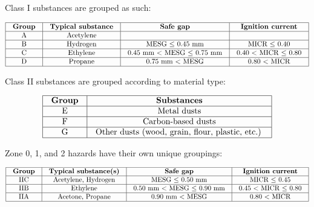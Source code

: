 \vskip 10pt

Class I substances are grouped as such:


$$\vbox{\offinterlineskip
\halign{\strut
\vrule \quad\hfil # \ \hfil & 
\vrule \quad\hfil # \ \hfil & 
\vrule \quad\hfil # \ \hfil & 
\vrule \quad\hfil # \ \hfil \vrule \cr
\noalign{\hrule}
%
{\bf Group} & {\bf Typical substance} & {\bf Safe gap} & {\bf Ignition current} \cr
%
\noalign{\hrule}
%
A & Acetylene &  &  \cr
%
\noalign{\hrule}
%
B & Hydrogen & MESG $\leq$ 0.45 mm & MICR $\leq$ 0.40 \cr
%
\noalign{\hrule}
%
C & Ethylene & 0.45 mm $<$ MESG $\leq$ 0.75 mm & 0.40 $<$ MICR $\leq$ 0.80 \cr
%
\noalign{\hrule}
%
D & Propane & 0.75 mm $<$ MESG & 0.80 $<$ MICR \cr
%
\noalign{\hrule}
} %
}$$ %

\vskip 10pt

Class II substances are grouped according to material type:


$$\vbox{\offinterlineskip
\halign{\strut
\vrule \quad\hfil # \ \hfil & 
\vrule \quad\hfil # \ \hfil \vrule \cr
\noalign{\hrule}
%
{\bf Group} & {\bf Substances} \cr
%
\noalign{\hrule}
%
E & Metal dusts \cr
%
\noalign{\hrule}
%
F & Carbon-based dusts \cr
%
\noalign{\hrule}
%
G & Other dusts (wood, grain, flour, plastic, etc.) \cr
%
\noalign{\hrule}
} %
}$$ %

\vskip 10pt

Zone 0, 1, and 2 hazards have their own unique groupings:


$$\vbox{\offinterlineskip
\halign{\strut
\vrule \quad\hfil # \ \hfil & 
\vrule \quad\hfil # \ \hfil & 
\vrule \quad\hfil # \ \hfil & 
\vrule \quad\hfil # \ \hfil \vrule \cr
\noalign{\hrule}
%
{\bf Group} & {\bf Typical substance(s)} & {\bf Safe gap} & {\bf Ignition current} \cr
%
\noalign{\hrule}
%
IIC & Acetylene, Hydrogen & MESG $\leq$ 0.50 mm & MICR $\leq$ 0.45 \cr
%
\noalign{\hrule}
%
IIB & Ethylene & 0.50 mm $<$ MESG $\leq$ 0.90 mm & 0.45 $<$ MICR $\leq$ 0.80 \cr
%
\noalign{\hrule}
%
IIA & Acetone, Propane & 0.90 mm $<$ MESG & 0.80 $<$ MICR \cr
%
\noalign{\hrule}
} %
}$$ %









